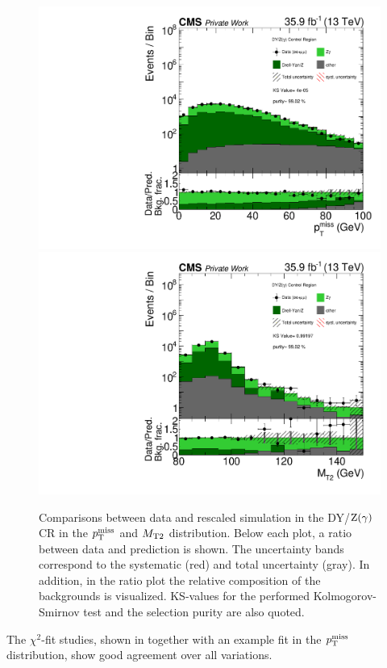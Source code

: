 \begin{figure}[tbp]
 \centering
 \includegraphics[width=\pairwidth]{figures/plots_CR_dy/CRDY_LL_nom_met_log}
 \includegraphics[width=\pairwidth]{figures/plots_CR_dy/CRDY_LL_nom_mt2_log}
 \caption{Comparisons between data and rescaled simulation in the DY/$\mathrm{Z}(\gamma)$ CR in the $p_{\mathrm{T}}^\text{miss}$ and $M_{\mathrm{T2}}$ distribution. Below each plot, a ratio between data and prediction is shown. The uncertainty bands correspond to the systematic (red) and total uncertainty (gray). In addition, in the ratio plot the relative composition of the backgrounds is visualized. KS-values for the performed Kolmogorov-Smirnov test and the selection purity are also quoted.}
 \label{fig:CRDY}
\end{figure}
The $\chi^2$-fit studies, shown in  together with an example fit in the $p_{\mathrm{T}}^\text{miss}$ distribution, show good agreement over all variations.

